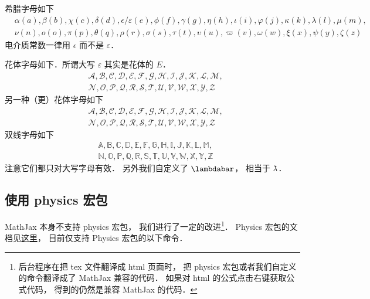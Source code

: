 希腊字母如下
\begin{equation}
\begin{aligned}
&\alpha (a), \beta (b), \chi (c), \delta (d), \epsilon/\varepsilon (e), \phi (f), \gamma (g),
\eta (h), \iota (i), \varphi (j), \kappa (k), \lambda (l), \mu (m),\\
& \nu (n), o (o), \pi (p), \theta (q), \rho (r), \sigma (s), \tau (t), \upsilon (u), \varpi (v), \omega (w), \xi (x), \psi (y), \zeta (z)
\end{aligned}
\end{equation}
电介质常数一律用 $\epsilon$ 而不是 $\varepsilon$．

花体字母如下．所谓大写 $\varepsilon$ 其实是花体的 $E$． 
\begin{equation}
\begin{aligned}
&\mathcal{A, B, C, D, E, F, G, H, I, J, K, L, M,}\\
&\mathcal{N, O, P, Q, R, S, T, U, V, W, X, Y, Z}
\end{aligned}
\end{equation}
另一种（更）花体字母如下
\begin{equation}
\begin{aligned}
&\mathscr{A, B, C, D, E, F, G, H, I, J, K, L, M,}\\
&\mathscr{N, O, P, Q, R, S, T, U, V, W, X, Y, Z}
\end{aligned}
\end{equation}
双线字母如下
\begin{equation}
\begin{aligned}
&\mathbb{A, B, C, D, E, F, G, H, I, J, K, L, M,}\\
&\mathbb{N, O, P, Q, R, S, T, U, V, W, X, Y, Z}
\end{aligned}
\end{equation}
注意它们都只对大写字母有效． 另外我们自定义了 $\lambdabar$， 相当于 $\mkern-0.25mu {\bar{\phantom{a}}} \mkern -10.2mu\lambda$．

\subsection{使用 physics 宏包}
MathJax 本身不支持 physics 宏包， 我们进行了一定的改进\footnote{后台程序在把 tex 文件翻译成 html 页面时， 把 physics 宏包或者我们自定义的命令翻译成了 MathJax 兼容的代码． 如果对 html 的公式点击右键获取公式代码， 得到的仍然是兼容 MathJax 的代码．}． Physics 宏包的文档见\href{http://mirrors.ibiblio.org/CTAN/macros/latex/contrib/physics/physics.pdf}{这里}， 目前仅支持 Physics 宏包的以下命令．

